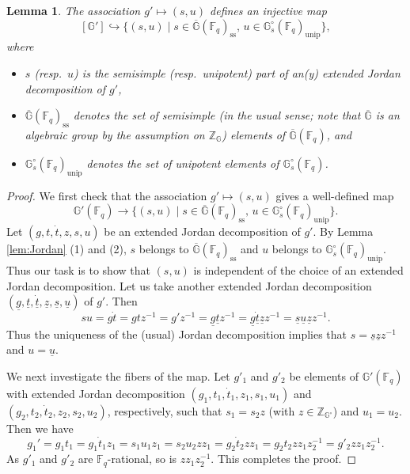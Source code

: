 \documentclass{amsart}
\renewcommand{\ss}{\mathrm{ss}}
\newcommand{\unip}{\mathrm{unip}}
\newcommand{\ul}{\underline}
\newcommand{\F}{\mathbb{F}}
\newcommand{\bbG}{\mathbb{G}}
\newcommand{\bbZ}{\mathbb{Z}}
\theoremstyle{plain}
\newtheorem{lem}[thm]{Lemma}
\theoremstyle{definition}
\theoremstyle{remark}
\theoremstyle{theorem}
\begin{document}
\begin{lem}\label{lem:Jordan-bij}
The association $g'\mapsto (s,u)$ defines an injective map
\[
[\bbG']
\hookrightarrow
\{(s,u)\mid s\in\overline{\bbG}(\F_{q})_{\ss},\, u\in\bbG^{\circ}_{s}(\F_{q})_{\unip}\},
\]
where
\begin{itemize}
\item
$s$ (resp.\ $u$) is the semisimple (resp.\ unipotent) part of an(y) extended Jordan decomposition of $g'$,
\item
$\overline{\bbG}(\F_{q})_{\ss}$ denotes the set of semisimple (in the usual sense; note that $\overline{\bbG}$ is an algebraic group by the assumption on $\bbZ_{\bbG}$) elements of $\overline{\bbG}(\F_{q})$, and
\item
$\bbG^{\circ}_{s}(\F_{q})_{\unip}$ denotes the set of unipotent elements of $\bbG_{s}^{\circ}(\F_{q})$.
\end{itemize}
\end{lem}

\begin{proof}
We first check that the association $g'\mapsto (s,u)$ gives a well-defined map
\[
\bbG'(\F_{q})
\rightarrow
\{(s,u)\mid s\in\overline{\bbG}(\F_{q})_{\ss},\, u\in\bbG^{\circ}_{s}(\F_{q})_{\unip}\}.
\]
Let $(g,t,\dot{t},z,s,u)$ be an extended Jordan decomposition of $g'$.
By Lemma \ref{lem:Jordan} (1) and (2), $s$ belongs to $\overline{\bbG}(\F_{q})_{\ss}$ and $u$ belongs to $\bbG_{s}^{\circ}(\F_{q})_{\unip}$.
Thus our task is to show that $(s,u)$ is independent of the choice of an extended Jordan decomposition.
Let us take another extended Jordan decomposition $(\ul{g},\ul{t},\ul{\dot{t}},\ul{z},\ul{s},\ul{u})$ of $g'$.
Then
\[
su
=g\dot{t}
=gtz^{-1}
=g'z^{-1}
=\ul{g}\ul{t}z^{-1}
=\ul{g}\ul{\dot{t}}\ul{z}z^{-1}
=\ul{s}\ul{u}\ul{z}z^{-1}.
\]
Thus the uniqueness of the (usual) Jordan decomposition implies that $s=\ul{s}\ul{z}z^{-1}$ and $u=\ul{u}$.

We next investigate the fibers of the map.
Let $g'_{1}$ and $g'_{2}$ be elements of $\bbG'(\F_{q})$ with extended Jordan decomposition $(g_{1},t_{1},\dot{t}_{1},z_{1},s_{1},u_{1})$ and $(g_{2},t_{2},\dot{t}_{2},z_{2},s_{2},u_{2})$, respectively, such that $s_{1}=s_{2}z$ (with $z\in\bbZ_{\bbG^{\circ}}$) and $u_{1}=u_{2}$.
Then we have
\[
g_{1}'
=g_{1}t_{1}
=g_{1}\dot{t}_{1}z_{1}
=s_{1}u_{1}z_{1}
=s_{2}u_{2}zz_{1}
=g_{2}\dot{t}_{2}zz_{1}
=g_{2}t_{2}zz_{1}z_{2}^{-1}
=g'_{2}zz_{1}z_{2}^{-1}.
\]
As $g'_{1}$ and $g'_{2}$ are $\F_{q}$-rational, so is $zz_{1}z_{2}^{-1}$.
This completes the proof.
\end{proof}
\end{document}
